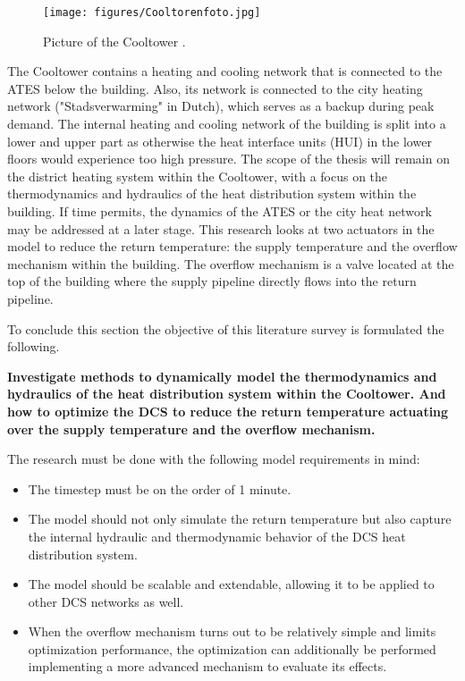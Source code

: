 \begin{figure}[h]
    \centering
    \texttt{[image: figures/Cooltorenfoto.jpg]}
    \caption{Picture of the Cooltower \cite{fotoCooltoren}.}
    \label{fig:Cooltoren}
\end{figure}

The Cooltower contains a heating and cooling network that is connected to the ATES below the building. Also, its network is connected to the city heating network ("Stadsverwarming" in Dutch), which serves as a backup during peak demand. The internal heating and cooling network of the building is split into a lower and upper part as otherwise the heat interface units (HUI) in the lower floors would experience too high pressure. The scope of the thesis will remain on the district heating system within the Cooltower, with a focus on the thermodynamics and hydraulics of the heat distribution system within the building. If time permits, the dynamics of the ATES or the city heat network may be addressed at a later stage.
This research looks at two actuators in the model to reduce the return temperature: the supply temperature and the overflow mechanism within the building. The overflow mechanism is a valve located at the top of the building where the supply pipeline directly flows into the return pipeline. 

To conclude this section the objective of this literature survey is formulated the following.

{\centering
\textbf{Investigate methods to dynamically model the thermodynamics and hydraulics of the heat distribution system within the Cooltower. And how to optimize the DCS to reduce the return temperature actuating over the supply temperature and the overflow mechanism.}\par
}
The research must be done with the following model requirements in mind:

\begin{itemize}
    \item The timestep must be on the order of 1 minute. 
    \item The model should not only simulate the return temperature but also capture the internal hydraulic and thermodynamic behavior of the DCS heat distribution system.
    \item The model should be scalable and extendable, allowing it to be applied to other DCS networks as well.
    \item When the overflow mechanism turns out to be relatively simple and limits optimization performance, the optimization can additionally be performed implementing a more advanced mechanism to evaluate its effects.
\end{itemize}

